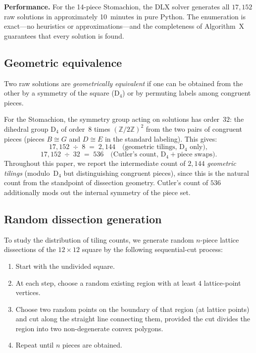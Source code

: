 \documentclass[12pt]{article}
\theoremstyle{definition}
\theoremstyle{remark}
\newcommand{\D}{\mathrm{D}}
\newcommand{\ZZ}{\mathbb{Z}}
\begin{document}
\textbf{Performance.} For the 14-piece Stomachion, the DLX solver
generates all $17{,}152$ raw solutions in approximately 10~minutes in
pure Python. The enumeration is exact---no heuristics or
approximations---and the completeness of Algorithm~X guarantees that
every solution is found.

\subsection{Geometric equivalence}

Two raw solutions are \emph{geometrically equivalent} if one can be
obtained from the other by a symmetry of the square ($\D_4$) or by
permuting labels among congruent pieces.

For the Stomachion, the symmetry group acting on solutions has
order~$32$: the dihedral group $\D_4$ of order~$8$ times $(\ZZ/2\ZZ)^2$
from the two pairs of congruent pieces (pieces $B \cong G$ and
$D \cong E$ in the standard labeling). This gives:
\[
17{,}152 \;\div\; 8 \;=\; 2{,}144 \quad \text{(geometric tilings, } \D_4 \text{ only)},
\]
\[
17{,}152 \;\div\; 32 \;=\; 536 \quad \text{(Cutler's count, } \D_4 + \text{piece swaps)}.
\]
Throughout this paper, we report the intermediate count of $2{,}144$
\emph{geometric tilings} (modulo~$\D_4$ but distinguishing congruent
pieces), since this is the natural count from the standpoint of
dissection geometry. Cutler's count of $536$ additionally mods out the
internal symmetry of the piece set.

\subsection{Random dissection generation}

To study the distribution of tiling counts, we generate random $n$-piece
lattice dissections of the $12 \times 12$ square by the following
sequential-cut process:

\begin{enumerate}
  \item Start with the undivided square.
  \item At each step, choose a random existing region with at least
    $4$ lattice-point vertices.
  \item Choose two random points on the boundary of that region (at
    lattice points) and cut along the straight line connecting them,
    provided the cut divides the region into two non-degenerate convex
    polygons.
  \item Repeat until $n$ pieces are obtained.
\end{enumerate}
\end{document}
